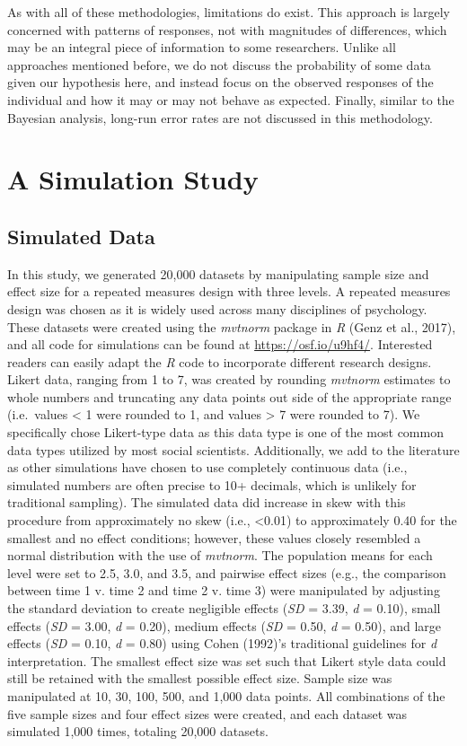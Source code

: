 \documentclass[english,man]{apa6}
\theoremstyle{definition}
\theoremstyle{definition}
\theoremstyle{definition}
\theoremstyle{remark}
\begin{document}
As with all of these methodologies, limitations do exist. This approach
is largely concerned with patterns of responses, not with magnitudes of
differences, which may be an integral piece of information to some
researchers. Unlike all approaches mentioned before, we do not discuss
the probability of some data given our hypothesis here, and instead
focus on the observed responses of the individual and how it may or may
not behave as expected. Finally, similar to the Bayesian analysis,
long-run error rates are not discussed in this methodology.

\section{A Simulation Study}\label{a-simulation-study}

\subsection{Simulated Data}\label{simulated-data}

In this study, we generated 20,000 datasets by manipulating sample size
and effect size for a repeated measures design with three levels. A
repeated measures design was chosen as it is widely used across many
disciplines of psychology. These datasets were created using the
\emph{mvtnorm} package in \emph{R} (Genz et al., 2017), and all code for
simulations can be found at \url{https://osf.io/u9hf4/}. Interested
readers can easily adapt the \emph{R} code to incorporate different
research designs. Likert data, ranging from 1 to 7, was created by
rounding \emph{mvtnorm} estimates to whole numbers and truncating any
data points out side of the appropriate range (i.e.~values \textless{} 1
were rounded to 1, and values \textgreater{} 7 were rounded to 7). We
specifically chose Likert-type data as this data type is one of the most
common data types utilized by most social scientists. Additionally, we
add to the literature as other simulations have chosen to use completely
continuous data (i.e., simulated numbers are often precise to 10+
decimals, which is unlikely for traditional sampling). The simulated
data did increase in skew with this procedure from approximately no skew
(i.e., \textless{}0.01) to approximately 0.40 for the smallest and no
effect conditions; however, these values closely resembled a normal
distribution with the use of \emph{mvtnorm}. The population means for
each level were set to 2.5, 3.0, and 3.5, and pairwise effect sizes
(e.g., the comparison between time 1 v. time 2 and time 2 v. time 3)
were manipulated by adjusting the standard deviation to create
negligible effects (\emph{SD} = 3.39, \emph{d} = 0.10), small effects
(\emph{SD} = 3.00, \emph{d} = 0.20), medium effects (\emph{SD} = 0.50,
\emph{d} = 0.50), and large effects (\emph{SD} = 0.10, \emph{d} = 0.80)
using Cohen (1992)'s traditional guidelines for \emph{d} interpretation.
The smallest effect size was set such that Likert style data could still
be retained with the smallest possible effect size. Sample size was
manipulated at 10, 30, 100, 500, and 1,000 data points. All combinations
of the five sample sizes and four effect sizes were created, and each
dataset was simulated 1,000 times, totaling 20,000 datasets.
\end{document}
